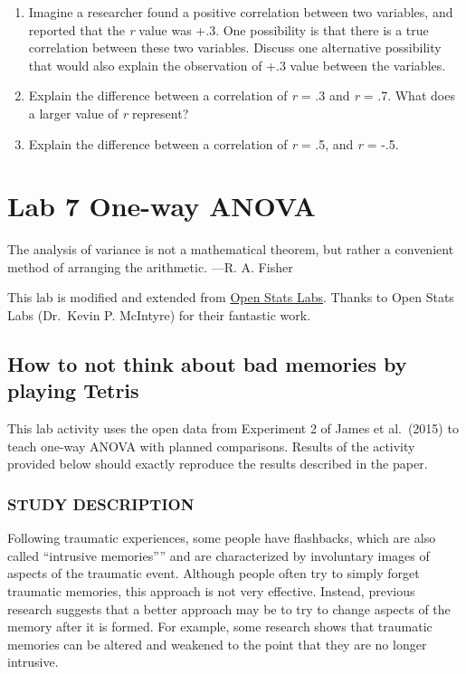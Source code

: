 \documentclass[
]{book}
\begin{document}
\begin{enumerate}
\def\labelenumi{\arabic{enumi}.}
\setcounter{enumi}{1}
\item
  Imagine a researcher found a positive correlation between two variables, and reported that the \emph{r} value was +.3. One possibility is that there is a true correlation between these two variables. Discuss one alternative possibility that would also explain the observation of +.3 value between the variables.
\item
  Explain the difference between a correlation of \emph{r} = .3 and \emph{r} = .7. What does a larger value of \emph{r} represent?
\item
  Explain the difference between a correlation of \emph{r} = .5, and \emph{r} = -.5.
\end{enumerate}

\hypertarget{lab-7-one-way-anova}{%
\chapter{Lab 7 One-way ANOVA}\label{lab-7-one-way-anova}}

{
The analysis of variance is not a mathematical theorem, but rather a convenient method of arranging the arithmetic.
---R. A. Fisher
}

This lab is modified and extended from \href{https://sites.trinity.edu/osl}{Open Stats Labs}. Thanks to Open Stats Labs (Dr.~Kevin P. McIntyre) for their fantastic work.

\hypertarget{how-to-not-think-about-bad-memories-by-playing-tetris}{%
\section{How to not think about bad memories by playing Tetris}\label{how-to-not-think-about-bad-memories-by-playing-tetris}}

This lab activity uses the open data from Experiment 2 of James et al.~(2015) to teach one-way ANOVA with planned comparisons. Results of the activity provided below should exactly reproduce the results described in the paper.

\hypertarget{study-description-2}{%
\subsection{STUDY DESCRIPTION}\label{study-description-2}}

Following traumatic experiences, some people have flashbacks, which are also called ``intrusive memories'''' and are characterized by involuntary images of aspects of the traumatic event. Although people often try to simply forget traumatic memories, this approach is not very effective. Instead, previous research suggests that a better approach may be to try to change aspects of the memory after it is formed. For example, some research shows that traumatic memories can be altered and weakened to the point that they are no longer intrusive.
\end{document}
